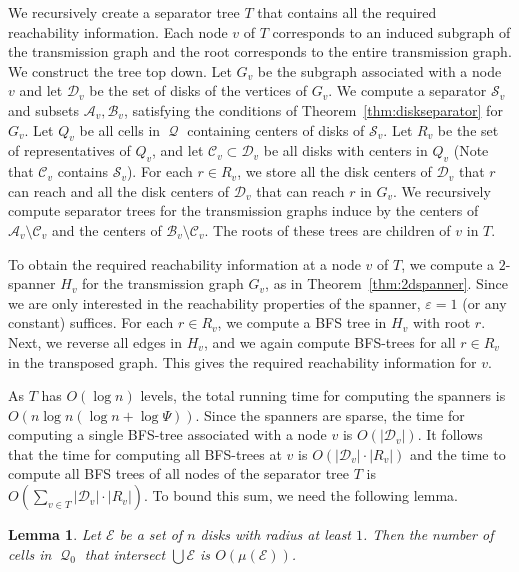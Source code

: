 \documentclass[11pt,a4paper]{paper}
\newtheorem{lemma}[theorem]{Lemma}
\newcommand{\eps}{\ensuremath {\varepsilon}}
\newcommand\A{{\mathcal A}}
\newcommand\B{{\mathcal B}}
\newcommand\C{{\mathcal C}}
\newcommand\D{{\mathcal D}}
\newcommand\E{{\mathcal E}}
\renewcommand\S{{\mathcal S}}
\DeclareMathOperator{\Q}{\mathcal{Q}}
\begin{document}
We recursively create a separator tree $T$
that contains all the required reachability information.
Each node $v$  of $T$ corresponds to an induced subgraph of the transmission graph and
the root corresponds to the entire transmission graph.
We construct the tree top down. Let $G_v$ be the subgraph associated with a node $v$ and let
$\D_v$ be the set of disks of the vertices of $G_v$.
We compute a separator $\S_v$  and subsets $\A_v,\B_v$, satisfying the conditions of Theorem~\ref{thm:diskseparator} for $G_v$.
Let $Q_v$ be all cells in $\Q$ containing centers of disks of
 $\S_v$. Let $R_v$ be the set of representatives of $Q_v$,
and let $\C_v\subset \D_v$ be all disks with centers in $Q_v$ (Note that $\C_v$ contains $\S_v$).
For each $r \in R_v$, we store all the disk centers of
$\D_v$ that $r$ can
reach and all the disk centers of
$\D_v$ that can reach $r$ in $G_v$.
We recursively compute separator trees for  the transmission graphs induce by the centers of $\A_v \setminus \C_v$ and
the centers of
$\B_v \setminus \C_v$. The roots of these trees are children of $v$ in $T$.

To obtain the  required reachability information at a node $v$ of $T$,
we compute a $2$-spanner $H_v$ for the transmission
graph $G_v$, as in Theorem~\ref{thm:2dspanner}.
Since we are only
interested in the reachability properties of the spanner,
$\eps = 1$ (or any constant) suffices.
For each $r \in R_v$,
we compute a BFS tree in $H_v$ with root $r$. Next, we reverse all
edges in $H_v$, and we again compute BFS-trees for all $r \in R_v$
in the transposed graph. This gives the required reachability
information for $v$.

As $T$ has $O(\log n)$ levels,
the total running time for computing the spanners is
$O(n\log n(\log n + \log \Psi))$.
Since the spanners are sparse, the time for computing a single BFS-tree
associated with a node $v$ is $O(|\D_v|)$. It follows that
 the time for computing all
BFS-trees at $v$ is $O(|\D_v|\cdot|R_v|)$ and the time to compute all BFS trees of all nodes  of
the separator tree $T$ is
$O(\sum_{v\in T} |\D_v|\cdot|R_v|)$. To bound this sum,
we need the
following lemma.

\begin{lemma}
\label{lem:diskunioncover}
Let $\E$ be a set of $n$ disks with radius at least $1$. Then
the number of cells in $\Q_0$ that intersect
$\bigcup \E$ is $O(\mu(\E))$.
\end{lemma}
\end{document}
